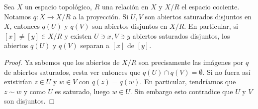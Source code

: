 \documentclass[11pt]{article}
\newcommand{\paint}[2]{\color{#1}{#2}}
\newenvironment{lemma}[2][Lema]{\begin{trivlist}
\item[\hskip \labelsep \paint{grey-light-blue}{{\bfseries #1}}\hskip \labelsep {\bfseries #2.}]}{\end{trivlist}}
\begin{document}
\begin{lemma}{4} Sea $X$ un espacio topol\'ogico, $R$ una relaci\'on en $X$ y $X/R$ el espacio cociente. Notamos $q : X \to X/R$ a la proyecci\'on. Si $U,V$ son abiertos saturados disjuntos en $X$, entonces $q(U)$ y $q(V)$ son abiertos disjuntos en $X/R$. En particular, si $[x] \neq [y] \in X/R$ y existen $U \ni x, V \ni y$ abiertos saturados disjuntos, los abiertos $q(U)$ y $q(V)$ separan a $[x]$ de $[y]$.
\end{lemma}
\begin{proof} Ya sabemos que los abiertos de $X/R$ son precisamente las im\'agenes por $q$ de abiertos saturados, resta ver entonces que $q(U) \cap q(V) = \emptyset$. Si no fuera as\'i existir\'ian $z \in U$ y $w \in V$ con $q(z) = q(w)$. En particular, tendr\'iamos que $z \sim w$ y como $U$ es saturado, luego $w \in U$. Sin embargo esto contradice que $U$ y $V$ son disjuntos.
\end{proof}
\end{document}

